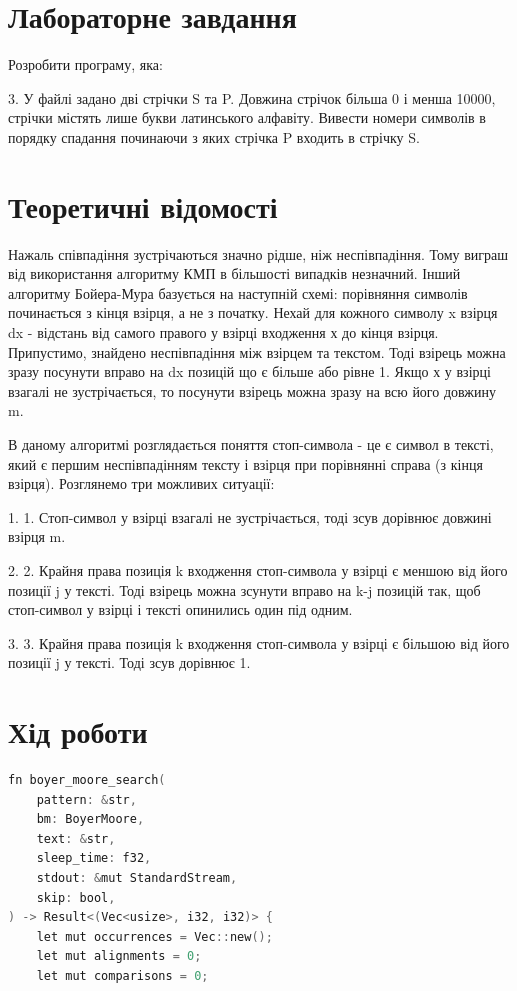 \documentclass{article}
\begin{document}
\begin{normalsize}
		\section*{Лабораторне завдання}

	Розробити програму, яка:
		\begin{center}
3.       У файлі задано дві стрічки S та P. Довжина стрічок більша 0 і менша 10000, стрічки містять лише букви латинського алфавіту. Вивести номери символів в  порядку спадання починаючи з яких стрічка P входить в стрічку S.
		\end{center}
		
		\section*{Теоретичні відомості}
		Нажаль співпадіння зустрічаються значно рідше, ніж неспівпадіння. Тому виграш від використання алгоритму КМП в більшості випадків незначний. Інший алгоритму Бойера-Мура базується на наступній схемі: порівняння символів починається з кінця взірця, а не з початку. Нехай для кожного символу x взірця dx - відстань від самого правого у взірці входження х до кінця взірця. Припустимо, знайдено неспівпадіння між взірцем та текстом. Тоді взірець можна зразу посунути вправо на dx позицій що є більше або рівне 1. Якщо х у взірці взагалі не зустрічається, то посунути взірець можна зразу на всю його довжину m.
		
		В даному алгоритмі розглядається поняття стоп-символа - це є символ в тексті, який є першим неспівпадінням тексту і взірця при порівнянні справа (з кінця взірця). Розглянемо три можливих ситуації:
		
		1.  1.           Стоп-символ у взірці взагалі не зустрічається, тоді зсув дорівнює довжині взірця m.
		
		2.  2.           Крайня права позиція k входження стоп-символа у взірці є меншою від його позиції j у тексті. Тоді взірець можна зсунути вправо на k-j позицій так, щоб стоп-символ у взірці і тексті опинились один під одним.
		
		3.  3.           Крайня права позиція k входження стоп-символа у взірці є більшою від його позиції j у тексті. Тоді зсув дорівнює 1.
		
		\section*{Хід роботи}
		\begin{lstlisting}[language=C]
fn boyer_moore_search(
	pattern: &str,
	bm: BoyerMoore,
	text: &str,
	sleep_time: f32,
	stdout: &mut StandardStream,
	skip: bool,
) -> Result<(Vec<usize>, i32, i32)> {
	let mut occurrences = Vec::new();
	let mut alignments = 0;
	let mut comparisons = 0;
	

\end{lstlisting}
\end{normalsize}
\end{document}
